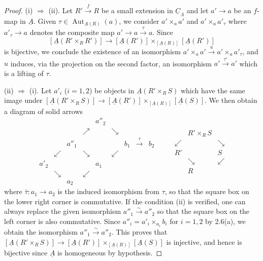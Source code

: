 \documentclass[11pt]{article}
\theoremstyle{plain}
\theoremstyle{definition}
\theoremstyle{remark}
\DeclareMathOperator{\Aut}{Aut}
\newcommand{\uA}{\underline{A}}\newcommand{\uH}{\underline{H}}\newcommand{\uExt}{\underline{\operatorname{Ext}}}\newcommand{\uL}{\underline{L}}\newcommand{\uM}{\underline{M}}\newcommand{\uZ}{\underline{Z}}\newcommand{\uB}{\underline{B}}\newcommand{\uC}{\underline{C}}\newcommand{\uD}{\underline{D}}\newcommand{\uE}{\underline{E}}\newcommand{\uG}{\underline{G}}\newcommand{\uP}{\underline{P}}\newcommand{\uQ}{\underline{Q}}
\begin{document}
\begin{proof}
(i) $\Rightarrow$ (ii). Let $R' \xrightarrow{f} R$ be a small extension in $\underline{C}_{\Lambda}$ and let $a' \to a$ be an $f$-map in $\uA$. Given $\tau \in \Aut_{\uA(R)}(a)$, we consider $a' \times_a a'$ and $a' \times_a a'_\tau$ where $a'_\tau \to a$ denotes the composite map $a' \to a \xrightarrow{\tau} a$. Since
\[
[\uA(R' \times_R R')] \longrightarrow [\uA(R')] \times_{[\uA(R)]} [\uA(R')]
\]
is bijective, we conclude the existence of an isomorphism $a' \times_a a' \xrightarrow{u} a' \times_a a'_\tau$, and $u$ induces, via the projection on the second factor, an isomorphism $a' \xrightarrow{\tau'} a'$ which is a lifting of $\tau$.

(ii) $\Rightarrow$ (i). Let $a'_i$ ($i = 1,2$) be objects in $\uA(R' \times_R S)$ which have the same image under $[\uA(R' \times_R S)] \to [\uA(R')] \times_{[\uA(R)]} [\uA(S)]$. We then obtain a diagram of solid arrows
\[
\begin{array}{ccccccccc}
& & & & a''_2 & & & & \\
& & & \nearrow & & \searrow & & & \\
& & a''_1 & & & & b_1 & \xrightarrow{\tau} & b_2 \\
& \swarrow & & \searrow & & \swarrow & & & \\
a'_2 & & & & a_1 & & & & \\
& \searrow & & \swarrow & & & & & \\
& & a_2 & & & & & &
\end{array}
\qquad
\begin{array}{ccc}
& R' \times_R S & \\
\swarrow & & \searrow \\
R' & & S \\
& \searrow & \swarrow \\
& R &
\end{array}
\]
where $\bar{\tau} : a_1 \to a_2$ is the induced isomorphism from $\tau$, so that the square box on the lower right corner is commutative. If the condition (ii) is verified, one can always replace the given isomorphism $a''_1 \xrightarrow{\sim} a''_2$ so that the square box on the left corner is also commutative. Since $a''_i = a'_i \times_{a_i} b_i$ for $i = 1,2$ by 2.6(a), we obtain the isomorphism $a''_1 \xrightarrow{\sim} a''_2$. This proves that $[\uA(R' \times_R S)] \longrightarrow [\uA(R')] \times_{[\uA(R)]} [\uA(S)]$ is injective, and hence is bijective since $\uA$ is homogeneous by hypothesis.
\end{proof}
\end{document}
